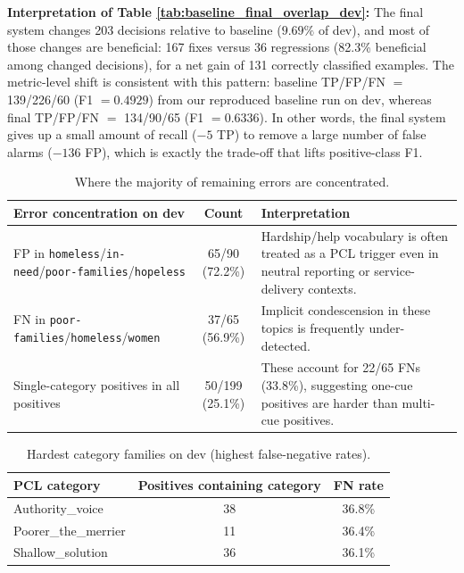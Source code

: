 \documentclass[11pt, a4paper]{article}
\begin{document}
\textbf{Interpretation of Table \ref{tab:baseline_final_overlap_dev}:}
The final system changes 203 decisions relative to baseline (\(9.69\%\) of dev), and most of those changes are beneficial: 167 fixes versus 36 regressions (82.3\% beneficial among changed decisions), for a net gain of 131 correctly classified examples. The metric-level shift is consistent with this pattern: baseline TP/FP/FN \(=\) 139/226/60 (F1 \(=0.4929\)) from our reproduced baseline run on dev, whereas final TP/FP/FN \(=\) 134/90/65 (F1 \(=0.6336\)). In other words, the final system gives up a small amount of recall (\(-5\) TP) to remove a large number of false alarms (\(-136\) FP), which is exactly the trade-off that lifts positive-class F1.

\begin{table}[H]
  \centering
  \scriptsize
  \begin{tabularx}{\linewidth}{>{\raggedright\arraybackslash}X c >{\raggedright\arraybackslash}X}
    \toprule
    Error concentration on dev & Count & Interpretation \\
    \midrule
    FP in \texttt{homeless}/\texttt{in-need}/\texttt{poor-families}/\texttt{hopeless} & 65/90 (72.2\%) & Hardship/help vocabulary is often treated as a PCL trigger even in neutral reporting or service-delivery contexts. \\
    FN in \texttt{poor-families}/\texttt{homeless}/\texttt{women} & 37/65 (56.9\%) & Implicit condescension in these topics is frequently under-detected. \\
    Single-category positives in all positives & 50/199 (25.1\%) & These account for 22/65 FNs (33.8\%), suggesting one-cue positives are harder than multi-cue positives. \\
    \bottomrule
  \end{tabularx}
  \caption{Where the majority of remaining errors are concentrated.}
  \label{tab:error_concentration_dev}
\end{table}

\begin{table}[H]
  \centering
  \small
  \begin{tabular}{lcc}
    \toprule
    PCL category & Positives containing category & FN rate \\
    \midrule
    Authority\_voice & 38 & 36.8\% \\
    Poorer\_the\_merrier & 11 & 36.4\% \\
    Shallow\_solution & 36 & 36.1\% \\
    \bottomrule
  \end{tabular}
  \caption{Hardest category families on dev (highest false-negative rates).}
  \label{tab:error_category_fn}
\end{table}
\end{document}
